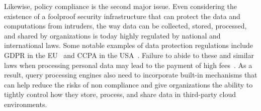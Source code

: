 



Likewise, policy compliance is the second major issue. Even considering the existence of a foolproof security infrastructure that can protect the data and computations from intruders, the way data can be collected, stored, processed, and shared by organizations is today highly regulated by national and international laws. Some notable examples of data protection regulations include GDPR in the EU~\cite{gdpr} and CCPA in the USA~\cite{ccpa}. Failure to abide to these and similar laws when processing personal data may lead to the payment of high fees~\cite{french-fine-google}. 
As a result, query processing engines also need to incorporate built-in mechanisms that can help reduce the risks of non compliance and give organizations the ability to tightly control how they store, process, and share data in third-party cloud environments.

